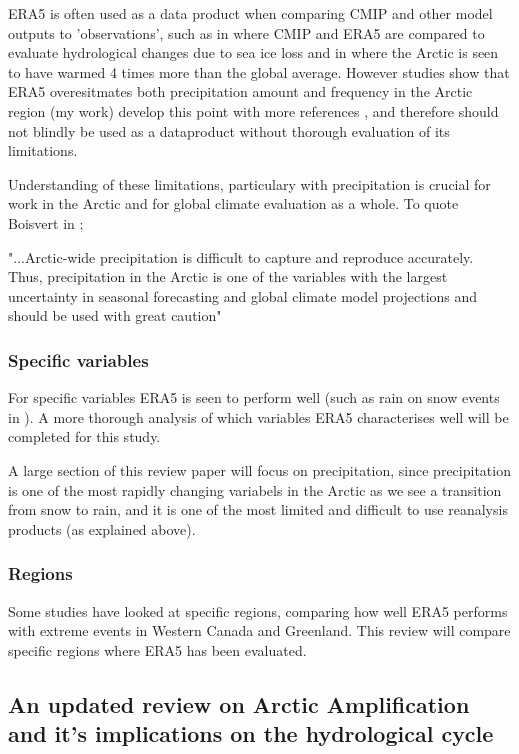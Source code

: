 \documentclass[11pt, oneside]{article}
\begin{document}
ERA5 is often used as a data product when comparing CMIP and other model outputs to 'observations', such as in \cite{ford2022arctic} where CMIP and ERA5 are compared to evaluate hydrological changes due to sea ice loss and in \cite{rantanen2022arctic} where the Arctic is seen to have warmed 4 times more than the global average. However studies show that ERA5 overesitmates both precipitation amount and frequency in the Arctic region (my work) {\color{blue} develop this point with more references} , and therefore should not blindly be used as a dataproduct without thorough evaluation of its limitations. 

Understanding of these limitations, particulary with precipitation is crucial for work in the Arctic and for global climate evaluation as a whole. To quote Boisvert in \cite{boisvert2018intercomparison};

"...Arctic-wide precipitation is difficult to capture and reproduce accurately. Thus, precipitation in the Arctic is one of the variables with the largest uncertainty in seasonal forecasting and global climate model projections and should be used with great caution"

\subsubsection{Specific variables}
For specific variables ERA5 is seen to perform well (such as rain on snow events in \cite{dou2021trends}). A more thorough analysis of which variables ERA5 characterises well will be completed for this study.

A large section of this review paper will focus on precipitation, since precipitation is one of the most rapidly changing variabels in the Arctic as we see a transition from snow to rain, and it is one of the most limited and difficult to use reanalysis products (as explained above).

\subsubsection{Regions}
Some studies have looked at specific regions, comparing how well ERA5 performs with extreme events \cite{loeb2022extreme} in Western Canada and Greenland. This review will compare specific regions where ERA5 has been evaluated.

\newpage
\pagebreak

\subsection{An updated review on Arctic Amplification and it's implications on the hydrological cycle}
\end{document}
